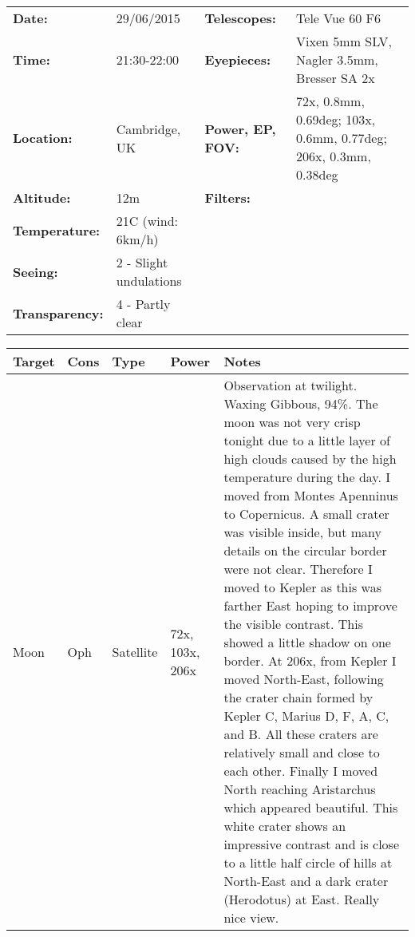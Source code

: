 \begin{tabular}{ p{0.9in} p{1.3in} p{1.2in} p{5.2in}}
{\bf Date:} & 29/06/2015 & {\bf Telescopes:} & Tele Vue 60 F6 \\ 
{\bf Time:} & 21:30-22:00 & {\bf Eyepieces:} & Vixen 5mm SLV, Nagler 3.5mm, Bresser SA 2x \\ 
{\bf Location:} & Cambridge, UK & {\bf Power, EP, FOV:} & 72x, 0.8mm, 0.69deg; 103x, 0.6mm, 0.77deg; 206x, 0.3mm, 0.38deg \\ 
{\bf Altitude:} & 12m & {\bf Filters:} &  \\ 
{\bf Temperature:} & 21C (wind: 6km/h) & & \\ 
{\bf Seeing:} & 2 - Slight undulations & & \\ 
{\bf Transparency:} & 4 - Partly clear & & \\ 
\end{tabular}
\begin{longtable}{ p{0.7in}  p{0.3in}  p{0.6in}  p{0.9in}  p{5.8in} }
\hline 
{\bf Target} & {\bf Cons} & {\bf Type} & {\bf Power} & {\bf Notes} \\ 
\hline 
Moon & Oph & Satellite & 72x, 103x, 206x & Observation at twilight. Waxing Gibbous, 94\%. The moon was not very crisp tonight due to a little layer of high clouds caused by the high temperature during the day. I moved from Montes Apenninus to Copernicus. A small crater was visible inside, but many details on the circular border were not clear. Therefore I moved to Kepler as this was farther East hoping to improve the visible contrast. This showed a little shadow on one border. At 206x, from Kepler I moved North-East, following the crater chain formed by Kepler C, Marius D, F, A, C, and B. All these craters are relatively small and close to each other. Finally I moved North reaching Aristarchus which appeared beautiful. This white crater shows an impressive contrast and is close to a little half circle of hills at North-East and a dark crater (Herodotus) at East. Really nice view. \\ 
\hline 
\end{longtable} 
